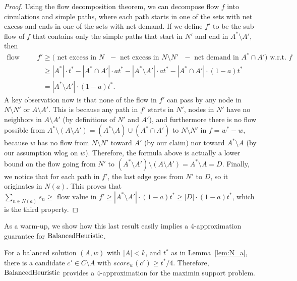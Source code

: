 \begin{proof}
Using the flow decomposition theorem, we can decompose flow $f$ into circulations and simple paths, where each path starts in one of the sets with net excess and ends in one of the sets with net demand. If we define $f'$ to be the sub-flow of $f$ that contains only the simple paths that start in $N'$ and end in $A^*\setminus A'$, then %
%
\begin{align*}
    \text{flow value in } f' &\geq (\text{ net excess in $N$ } - \text{ net excess in $N\setminus N'$ } - \text{ net demand in $A^*\cap A')$ w.r.t. } f\\
    &\geq |A^*|\cdot t^* - |A^*\cap A'|\cdot a t^* -|A^*\setminus A'|\cdot a t^* -|A^*\cap A'|\cdot (1-a) t^*\\
    & = |A^*\setminus A'|\cdot (1-a)t^*.
\end{align*}
%
A key observation now is that none of the flow in $f'$ can pass by any node in $N\setminus N'$ or $A\setminus A'$. 
This is because any path in $f'$ starts in $N'$, nodes in $N'$ have no neighbors in $A\setminus A'$ (by definitions of $N'$ and $A'$), and furthermore there is no flow possible from $A^*\setminus (A\setminus A')=(A^*\setminus A)\cup (A^*\cap A')$ to $N\setminus N'$ in $f=w^*-w$, because $w$ has no flow from $N\setminus N'$ toward $A'$ (by our claim) nor toward $A^*\setminus A$ (by our assumption wlog on $w$).
Therefore, the formula above is actually a lower bound on the flow going from $N'$ to $(A^*\setminus A')\setminus (A\setminus A')=A^*\setminus A=D$. Finally, we notice that for each path in $f'$, the last edge goes from $N'$ to $D$, so it originates in $N(a)$. This proves that $\sum_{n\in N(a)} s_n\geq \text{ flow value in } f'\geq |A^*\setminus A'|\cdot (1-a) t^* \geq |D|\cdot (1-a) t^*$, which is the third property.
\end{proof}

As a warm-up, we show how this last result easily implies a $4$-approximation guarantee for $\operatorname{BalancedHeuristic}$.

\begin{lemma}
For a balanced solution $(A,w)$ with $|A|<k$, and $t^*$ as in Lemma~\ref{lem:N_a}, there is a candidate $c'\in C\setminus A$ with $score_w(c')\geq t^*/4$. Therefore, $\operatorname{BalancedHeuristic}$ provides a $4$-approximation for the maximin support problem.
\end{lemma}

